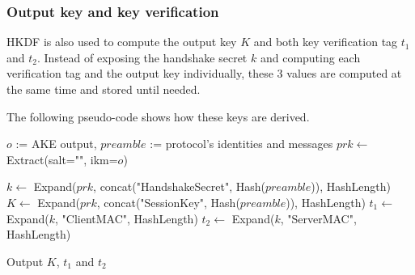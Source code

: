 \documentclass[../report.tex]{subfiles}
\begin{document}
% 
% 


\subsubsection{Output key and key verification}

HKDF is also used to compute the output key $K$ and both key verification tag $t_1$ and $t_2$.
Instead of exposing the handshake secret $k$ and computing each verification tag and the output key individually, these 3 values are computed at the same time and stored until needed.

The following pseudo-code shows how these keys are derived.
\begin{algorithmic}
\Require $o$ := AKE output, $preamble$ := protocol's identities and messages
\State $prk \gets$ Extract(salt="", ikm=$o$)


\State $k \gets$ Expand($prk$, concat("HandshakeSecret", Hash($preamble$)), HashLength)
\State $K \gets$ Expand($prk$, concat("SessionKey", Hash($preamble$)), HashLength)
\State $t_1 \gets$ Expand($k$, "ClientMAC", HashLength)
\State $t_2 \gets$ Expand($k$, "ServerMAC", HashLength)

\State Output $K$, $t_1$ and $t_2$
\end{algorithmic}

% 
% 
% 
\end{document}
